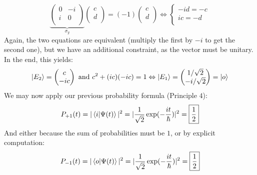 \documentclass[solutions.tex]{subfiles}
\begin{document}
\[
	\underbrace{\begin{pmatrix}
		0 & -i \\
		i &  0 \\
	\end{pmatrix}}_{\sigma_y} \begin{pmatrix} c \\ d \\ \end{pmatrix}
		= (-1)\begin{pmatrix} c \\ d \\ \end{pmatrix}
	\Leftrightarrow \begin{cases}
		-id = -c \\
		ic = -d \\
	\end{cases}
\]
Again, the two equations are equivalent (multiply the first by $-i$ to
get the second one), but we have an additional constraint, as the
vector must be unitary. In the end, this yields:
\[
	|E_2\rangle = \begin{pmatrix}
		c \\
		-ic \\
	\end{pmatrix} \text{ and } c^2+(ic)(-ic) = 1
	\Leftrightarrow
	|E_1\rangle = \begin{pmatrix}
		1/\sqrt2 \\
		-i/\sqrt2 \\
	\end{pmatrix} = |o\rangle
\]
We may now apply our previous probability formula (Principle $4$):
\[
	P_{+1}(t) = |\left\langle i \middle| \Psi(t) \right\rangle|^2 =
		|\frac1{\sqrt2}\exp(-\frac{it}\hbar)|^2 = \boxed{\frac12}
\]
And either because the sum of probabilities must be $1$, or by
explicit computation:
\[
	P_{-1}(t) = |\left\langle o \middle| \Psi(t) \right\rangle|^2 =
		|\frac1{\sqrt2}\exp(-\frac{it}\hbar)|^2 = \boxed{\frac12}
\]
\end{document}

